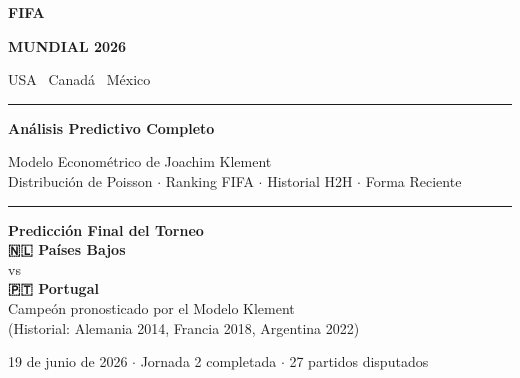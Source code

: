 \documentclass[11pt,a4paper]{article}
\begin{document}
\begin{titlepage}
  \pagecolor{fifablue}
  \color{white}
  \centering
  \vspace*{3cm}
  
  {\fontsize{48}{56}\selectfont\bfseries\textcolor{fifagold}{FIFA}}
  
  \vspace{0.3cm}
  {\fontsize{36}{44}\selectfont\bfseries MUNDIAL 2026}
  
  \vspace{0.2cm}
  {\fontsize{18}{24}\selectfont USA \textbullet\ Canadá \textbullet\ México}
  
  \vspace{1.5cm}
  \textcolor{fifagold}{\rule{12cm}{1.5pt}}
  
  \vspace{1.2cm}
  {\LARGE\bfseries Análisis Predictivo Completo}
  
  \vspace{0.6cm}
  {\large Modelo Econométrico de Joachim Klement}\\[0.3cm]
  {\normalsize Distribución de Poisson $\cdot$ Ranking FIFA $\cdot$ Historial H2H $\cdot$ Forma Reciente}
  
  \vspace{1.5cm}
  \textcolor{fifagold}{\rule{12cm}{1.5pt}}
  
  \vspace{1.5cm}
  
  \begin{tcolorbox}[colback=white!15!fifablue, colframe=fifagold, 
                    width=10cm, arc=6pt, boxrule=1.5pt]
    \centering\large
    \textcolor{fifagold}{\textbf{Predicción Final del Torneo}}\\[0.5cm]
    {\Huge\bfseries\textcolor{fifagold}{🇳🇱 Países Bajos}}\\[0.3cm]
    {\large vs}\\[0.3cm]
    {\large\bfseries 🇵🇹 Portugal}\\[0.3cm]
    {\normalsize Campeón pronosticado por el Modelo Klement}\\
    {\small (Historial: Alemania 2014, Francia 2018, Argentina 2022)}
  \end{tcolorbox}
  
  \vfill
  {\small 19 de junio de 2026 $\cdot$ Jornada 2 completada $\cdot$ 27 partidos disputados}
\end{titlepage}
\nopagecolor
\end{document}
